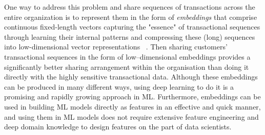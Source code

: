 \documentclass[sigconf, anonymous]{acmart}
\begin{document}
One way to address this problem and share sequences of transactions across the entire organization is to represent them in the form of \emph{embeddings} that comprise continuous fixed-length vectors capturing the "essence" of transactional sequences through learning their internal patterns and compressing these (long) sequences into low-dimensional vector representations ~\citep{Mikolov2013EfficientEO, Peters2018DeepCW, Devlin2019BERTPO, Doersch2015UnsupervisedVR, Oord2018RepresentationLW}.
Then sharing customers' transactional sequences in the form of low--dimensional embeddings provides a significantly better sharing arrangement within the organisation than doing it directly with the highly sensitive transactional data. Although these embeddings can be produced in many different ways, using deep learning to do it is a promising and rapidly growing approach in ML. 
Furthermore, embeddings can be used in building ML models directly as features in an effective and quick manner, and using them in ML models does not require extensive feature engineering and deep domain knowledge to design features on the part of data scientists. 

\end{document}
